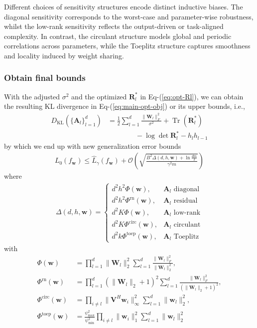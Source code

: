 \documentclass[journal]{IEEEtran} %
\def\eqref#1{Eq-(\ref{#1})}
\newcommand{\nn}{\nonumber}
\def\vw{{\bm{w}}}
\def\mA{{\bm{A}}}
\def\mR{{\bm{R}}}
\def\mV{{\bm{V}}}
\def\mW{{\bm{W}}}
\def\gO{{\mathcal{O}}}
\newcommand{\KL}{D_{\mathrm{KL}}}
\newcommand{\Norm}[1]{\|#1\|}
\DeclareMathOperator{\Tr}{Tr}
\begin{document}
% 
Different choices of sensitivity structures encode distinct inductive biases. The diagonal sensitivity corresponds to the worst-case and parameter-wise robustness, whilst the low-rank sensitivity reflects the output-driven or task-aligned complexity. In contrast, the circulant structure models global and periodic correlations across parameters, while the Toeplitz structure captures smoothness and locality induced by weight sharing.




\subsubsection{Obtain final bounds} 
With the adjusted ${\sigma}^2$
and the optimized $\mR_l^*$ in \eqref{eq:opt-Rl}, we can obtain the resulting KL divergence in \eqref{eq:main-opt-obj} or its upper bounds, i.e.,
\begin{align}
     \KL(\{\mA_l\}_{l=1}^d) &=  \frac{1}{2} \sum_{l=1}^d \frac{\|\mW_l\|_F^2}{{\sigma}^2} + \Tr(\mR_l^*) \nn \\
    &\qquad \qquad - \log \det \mR_l^* - h_lh_{l-1} 
\end{align}
% 
by which we end up with new generalization error bounds
\begin{align} \label{eq:gene-bounds-all}
    L_0(f_{\vw}) \le \hat{L}_{\gamma}(f_{\vw}) + \gO \left( \sqrt{ \frac{ B^2 \Delta(d,h,\vw) + \ln \frac{dm}{\delta}}{\gamma^2m}} \right)
\end{align}
where 
\begin{align}
\Delta(d,h,\vw) = \left\{
    \begin{matrix}
        d^2h^2\Phi(\vw), & \text{$\mA_l$ diagonal}\\
        d^2h^2\Phi^{\mathrm{rn}}(\vw), & \text{$\mA_l$ residual}\\
        d^2K\Phi(\vw), & \text{$\mA_l$ low-rank}\\
        d^2K{\Phi}^{\mathrm{circ}}(\vw), & \text{$\mA_l$ circulant}\\
        d^2k\Phi^{\mathrm{toep}}(\vw), & \text{$\mA_l$ Toeplitz}
    \end{matrix}
    \right.
\end{align}
with 
\begin{align}
    \Phi(\vw)&=\prod_{l=1}^d \Norm{\mW_l}_2^2  \sum_{l=1}^d \frac{\Norm{\mW_l}_F^2}{\Norm{\mW_l}_2^2}, \\ 
    \Phi^{\mathrm{rn}}(\vw)&=\prod_{l=1}^d (\Norm{\mW_l}_2+1)^2  \sum_{l=1}^d \frac{\Norm{\mW_l}_F^2}{(\Norm{\mW_l}_2+1)^2},\\
    {\Phi}^{\mathrm{circ}}(\vw)&=\prod_{i\ne l} \Norm{\mV^H \vw_i}_{\infty}^2 \sum_{l=1}^d \Norm{\vw_l}_2^2,\\
    \Phi^{\mathrm{toep}}(\vw)&=\frac{\psi_{\max}^2}{\psi_{\min}^2} \prod_{i\ne l} \Norm{\vw_i}_1^2 \sum_{l=1}^d \Norm{\vw_l}_2^2
\end{align}
\end{document}
